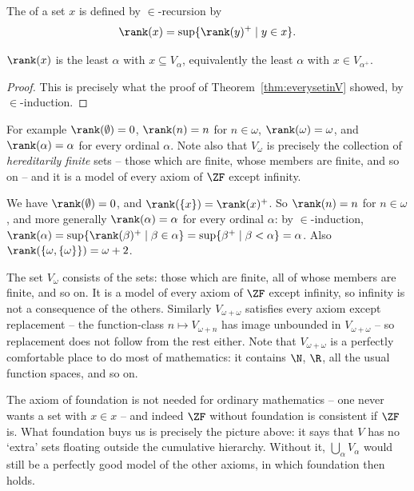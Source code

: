 \begin{definition}[Rank]
  The  of a set $x$ is defined by $\in$-recursion by
  $$
\rank(x) = \sup \{\rank(y)^+ \mid y \in x\}.
  $$
\end{definition}

\begin{proposition}
  $\rank(x)$ is the least $\alpha$ with $x \subseteq V_\alpha$, equivalently the least $\alpha$ with $x \in V_{\alpha^+}$.
\end{proposition}
\begin{proof}
  This is precisely what the proof of Theorem~\ref{thm:everysetinV} showed, by $\in$-induction.
\end{proof}

For example $\rank(\emptyset) = 0$, $\rank(n) = n$ for $n \in \omega$, $\rank(\omega) = \omega$, and $\rank(\alpha) = \alpha$ for every ordinal $\alpha$. Note also that $V_\omega$ is precisely the collection of \emph{hereditarily finite} sets -- those which are finite, whose members are finite, and so on -- and it is a model of every axiom of $\ZF$ except infinity.

\begin{example}
  We have $\rank(\emptyset) = 0$, and $\rank(\{x\}) = \rank(x)^+$. So $\rank(n) = n$ for $n \in \omega$, and more generally $\rank(\alpha) = \alpha$ for every ordinal $\alpha$: by $\in$-induction, $\rank(\alpha) = \sup\{\rank(\beta)^+ \mid \beta \in \alpha\} = \sup\{\beta^+ \mid \beta < \alpha\} = \alpha$. Also $\rank(\{\omega, \{\omega\}\}) = \omega + 2$.
\end{example}

\begin{example}
  The set $V_\omega$ consists of the  sets: those which are finite, all of whose members are finite, and so on. It is a model of every axiom of $\ZF$ except infinity, so infinity is not a consequence of the others. Similarly $V_{\omega+\omega}$ satisfies every axiom except replacement -- the function-class $n \mapsto V_{\omega + n}$ has image unbounded in $V_{\omega+\omega}$ -- so replacement does not follow from the rest either. Note that $V_{\omega + \omega}$ is a perfectly comfortable place to do most of mathematics: it contains $\N$, $\R$, all the usual function spaces, and so on.
\end{example}

\begin{remark}
  The axiom of foundation is not needed for ordinary mathematics -- one never wants a set with $x \in x$ -- and indeed $\ZF$ without foundation is consistent if $\ZF$ is. What foundation buys us is precisely the picture above: it says that $V$ has no `extra' sets floating outside the cumulative hierarchy. Without it, $\bigcup_\alpha V_\alpha$ would still be a perfectly good model of the other axioms, in which foundation then holds.
\end{remark}

